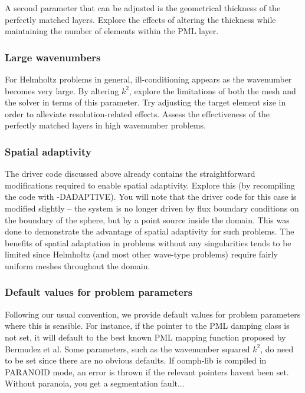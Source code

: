 A second parameter that can be adjusted is the geometrical thickness of the perfectly matched layers. Explore the effects of altering the thickness while maintaining the number of elements within the P\+ML layer.\hypertarget{index_large_k}{}\subsubsection{Large wavenumbers}\label{index_large_k}
For Helmholtz problems in general, ill-\/conditioning appears as the wavenumber becomes very large. By altering $ k^2 $, explore the limitations of both the mesh and the solver in terms of this parameter. Try adjusting the target element size in order to alleviate resolution-\/related effects. Assess the effectiveness of the perfectly matched layers in high wavenumber problems.\hypertarget{index_adaptivity}{}\subsubsection{Spatial adaptivity}\label{index_adaptivity}
The driver code discussed above already contains the straightforward modifications required to enable spatial adaptivity. Explore this (by recompiling the code with -\/\+D\+A\+D\+A\+P\+T\+I\+VE). You will note that the driver code for this case is modified slightly -- the system is no longer driven by flux boundary conditions on the boundary of the sphere, but by a point source inside the domain. This was done to demonstrate the advantage of spatial adaptivity for such problems. The benefits of spatial adaptation in problems without any singularities tends to be limited since Helmholtz (and most other wave-\/type problems) require fairly uniform meshes throughout the domain.\hypertarget{index_default}{}\subsubsection{Default values for problem parameters}\label{index_default}
Following our usual convention, we provide default values for problem parameters where this is sensible. For instance, if the pointer to the P\+ML damping class is not set, it will default to the best known P\+ML mapping function proposed by Bermudez et al. Some parameters, such as the wavenumber squared $ k^2 $, do need to be set since there are no obvious defaults. If {\ttfamily oomph-\/lib} is compiled in {\ttfamily P\+A\+R\+A\+N\+O\+ID} mode, an error is thrown if the relevant pointers haven\textquotesingle{}t been set. Without paranoia, you get a segmentation fault...

